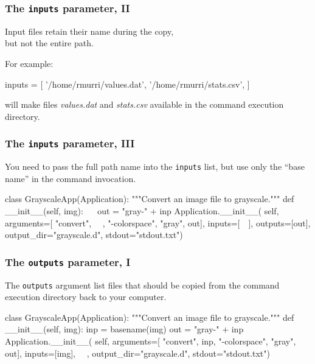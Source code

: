 \documentclass[english,serif,mathserif,xcolor=pdftex,dvipsnames,table]{beamer}
\begin{document}
\begin{frame}[fragile]
  \frametitle{The \texttt{inputs} parameter, II}

  Input files retain their name during the copy, \\ but not the entire path.

  \+
  For example:
  \begin{python}
    inputs = [
      '/home/rmurri/values.dat',
      '/home/rmurri/stats.csv',
      ]
  \end{python}
  will make files \emph{values.dat} and \emph{stats.csv} available in
  the command execution directory.

\end{frame}


\begin{frame}[fragile]
  \frametitle{The \texttt{inputs} parameter, III}

  You need to pass the full path name into the
  \texttt{inputs} list, but use only the ``base name'' in the command
  invocation.

\begin{python}
class GrayscaleApp(Application):
  """Convert an image file to grayscale."""
  def __init__(self, img):
    ~~
    out = "gray-" + inp
    Application.__init__(
      self,
      arguments=[
        "convert", ~~, "-colorspace", "gray", out],
      inputs=[~~],
      outputs=[out],
      output_dir="grayscale.d",
      stdout="stdout.txt")
\end{python}
\end{frame}


\begin{frame}[fragile]
\frametitle{The \texttt{outputs} parameter, I}

The \texttt{outputs} argument list files that should be copied from
the command execution directory back to your computer.

  \+
\begin{python}
class GrayscaleApp(Application):
  """Convert an image file to grayscale."""
  def __init__(self, img):
    inp = basename(img)
    out = "gray-" + inp
    Application.__init__(
      self,
      arguments=[
        "convert", inp, "-colorspace", "gray", out],
      inputs=[img],
      ~~,
      output_dir="grayscale.d",
      stdout="stdout.txt")
\end{python}
\end{frame}
\end{document}
